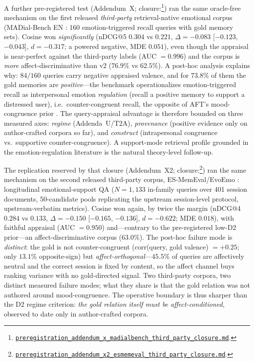 \documentclass[11pt]{article}
\newcommand{\repourl}{https://github.com/gianlucamazza/emotional-memory}%
\begin{document}
A further pre-registered test (Addendum~X; closure:\footnote{%
\href{\repourl/blob/main/benchmarks/preregistration\_addendum\_x\_madialbench\_third\_party\_closure.md}%
{\texttt{preregistration\_addendum\_x\_madialbench\_third\_party\_closure.md}}.}) ran the same
oracle-free mechanism on the first released \emph{third-party} retrieval-native emotional
corpus (MADial-Bench EN \citep{he2025madialbench}: 160 emotion-triggered recall queries with
gold memory sets). Cosine won \emph{significantly} (nDCG@5 $0.304$ vs $0.221$, $\Delta=-0.083$
[$-0.123$, $-0.043$], $d=-0.317$; a powered negative, MDE $0.051$), even though the appraisal
is near-perfect against the third-party labels (AUC $=0.996$) and the corpus is \emph{more}
affect-discriminative than v2 ($76.9\%$ vs $62.5\%$). A post-hoc analysis explains why:
$84/160$ queries carry negative appraised valence, and for $73.8\%$ of them the gold memories
are \emph{positive}---the benchmark operationalizes emotion-triggered recall as interpersonal
emotion \emph{regulation} (recall a positive memory to support a distressed user), i.e.\
counter-congruent recall, the opposite of AFT's mood-congruence prior \citep{bower1981mood}.
The query-appraisal advantage is therefore bounded on three measured axes: \emph{regime}
(Addenda~U/T2A), \emph{provenance} (positive evidence only on author-crafted corpora so far),
and \emph{construct} (intrapersonal congruence vs.\ supportive counter-congruence). A
support-mode retrieval profile grounded in the emotion-regulation literature is the natural
theory-level follow-up.

The replication reserved by that closure (Addendum~X2; closure:\footnote{%
\href{\repourl/blob/main/benchmarks/preregistration\_addendum\_x2\_esmemeval\_third\_party\_closure.md}%
{\texttt{preregistration\_addendum\_x2\_esmemeval\_third\_party\_closure.md}}.}) ran the same
mechanism on the second released third-party corpus, ES-MemEval/EvoEmo
\citep{chen2026esmemeval}: longitudinal emotional-support QA ($N{=}1{,}133$ in-family
queries over 401 session documents, 50-candidate pools replicating the upstream
session-level protocol, upstream-verbatim metrics). Cosine won again, by twice the margin
(nDCG@4 $0.284$ vs $0.133$, $\Delta=-0.150$ [$-0.165$, $-0.136$], $d=-0.622$; MDE $0.018$),
with faithful appraisal (AUC $=0.950$) and---contrary to the pre-registered low-D2
prior---an affect-discriminative corpus ($63.0\%$). The post-hoc failure mode is
\emph{distinct}: the gold is not counter-congruent (corr(query, gold valence) $=+0.25$;
only $13.1\%$ opposite-sign) but \emph{affect-orthogonal}---$45.5\%$ of queries are
affectively neutral and the correct session is fixed by content, so the affect channel
buys ranking variance with no gold-directed signal. Two third-party corpora, two distinct
measured failure modes; what they share is that the gold relation was not authored around
mood-congruence. The operative boundary is thus sharper than the D2 regime criterion:
\emph{the gold relation itself must be affect-conditioned}, observed to date only in
author-crafted corpora.
\end{document}
